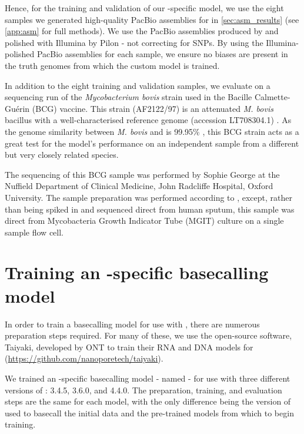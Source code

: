 Hence, for the training and validation of our \mtb{}-specific model, we use the eight samples we generated high-quality PacBio assemblies for in \autoref{sec:asm_results} (see \autoref{app:asm} for full methods). We use the PacBio assemblies produced by \flye{} and polished with Illumina by Pilon - not correcting for SNPs. By using the Illumina-polished PacBio assemblies for each sample, we ensure no \ont{} biases are present in the truth genomes from which the custom model is trained.

In addition to the eight training and validation samples, we evaluate on a \ont{} sequencing run of the \textit{Mycobacterium bovis} strain used in the Bacille Calmette-Guérin (BCG) vaccine. This strain (AF2122/97) is an attenuated \textit{M. bovis} bacillus \cite{luca2013} with a well-characterised reference genome (accession LT708304.1) \cite{Malone2017}. As the genome similarity between \textit{M. bovis} and \mtb{} is 99.95\% \cite{Kanipe2020}, this BCG strain acts as a great test for the model's performance on an independent sample from a different but very closely related species.

The \ont{} sequencing of this BCG sample was performed by Sophie George at the Nuffield Department of Clinical Medicine, John Radcliffe Hospital, Oxford University. The sample preparation was performed according to \cite{George2020}, except, rather than being spiked in and sequenced direct from human sputum, this sample was direct from Mycobacteria Growth Indicator Tube (MGIT) culture on a single sample flow cell.

\section{Training an \mtb{}-specific \ont{} basecalling model}

In order to train a basecalling model for use with \guppy{}, there are numerous preparation steps required. For many of these, we use the open-source software, Taiyaki, developed by ONT to train their RNA and DNA models for \guppy{} (\url{https://github.com/nanoporetech/taiyaki}).

We trained an \mtb{}-specific basecalling model - named \tubby{} - for use with three different versions of \guppy{}: 3.4.5, 3.6.0, and 4.4.0. The preparation, training, and evaluation steps are the same for each model, with the only difference being the version of \guppy{} used to basecall the initial data and the pre-trained models from which to begin training.


